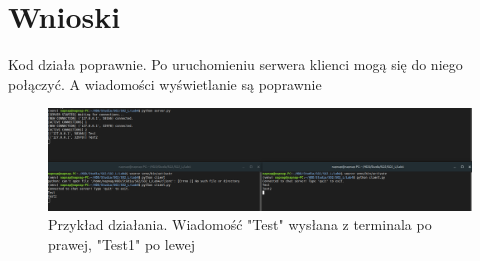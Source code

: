 \documentclass{article}
\begin{document}
    \section{Wnioski}
        Kod działa poprawnie.
        Po uruchomieniu serwera klienci mogą się do niego połączyć.
        A wiadomości wyświetlanie są poprawnie
        \begin{figure}[ht]
            \centering
            \includegraphics[width=\textwidth]{images/image.png}
            \caption{Przykład działania. Wiadomość "Test" wysłana z terminala po prawej, "Test1" po lewej}
            \label{fig:run_succes}
        \end{figure}
\end{document}
